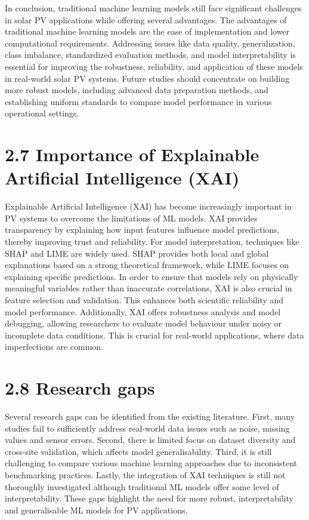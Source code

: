 In conclusion, traditional machine learning models still face significant challenges in solar PV applications while offering several advantages. The advantages of traditional machine learning models are the ease of implementation and lower computational requirements. Addressing issues like data quality, generalization, class imbalance, standardized evaluation methods, and model interpretability is essential for improving the robustness, reliability, and application of these models in real-world solar PV systems. Future studies should concentrate on building more robust models, including advanced data preparation methods, and establishing uniform standards to compare model performance in various operational settings.

\section{2.7 Importance of Explainable Artificial Intelligence (XAI)}
Explainable Artificial Intelligence (XAI) has become increasingly important in PV systems to overcome the limitations of ML models. XAI provides transparency by explaining how input features influence model predictions, thereby improving trust and reliability. For model interpretation, techniques like SHAP and LIME are widely used. SHAP provides both local and global explanations based on a strong theoretical framework, while LIME focuses on explaining specific predictions. In order to ensure that models rely on physically meaningful variables rather than inaccurate correlations, XAI is also crucial in feature selection and validation. This enhances both scientific reliability and model performance. Additionally, XAI offers robustness analysis and model debugging, allowing researchers to evaluate model behaviour under noisy or incomplete data conditions. This is crucial for real-world applications, where data imperfections are common.
\section{2.8 Research gaps}
Several research gaps can be identified from the existing literature. First, many studies fail to sufficiently address real-world data issues such as noise, missing values and sensor errors. Second, there is limited focus on dataset diversity and cross-site validation, which affects model generalisability. Third, it is still challenging to compare various machine learning approaches due to inconsistent benchmarking practices. Lastly, the integration of XAI techniques is still not thoroughly investigated although traditional ML models offer some level of interpretability. These gaps highlight the need for more robust, interpretability and generalisable ML models for PV applications.
